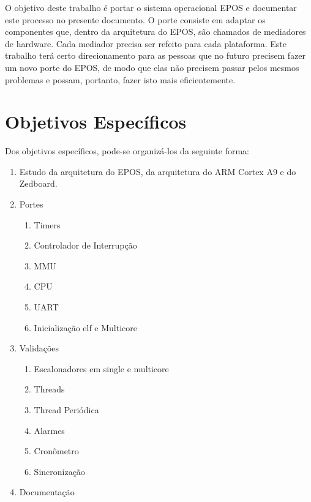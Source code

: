 O objetivo deste trabalho é portar o sistema operacional EPOS e documentar este processo no presente documento. O porte consiste em adaptar os componentes que, dentro da arquitetura do EPOS, são chamados de mediadores de hardware. Cada mediador precisa ser refeito para cada plataforma.
Este trabalho terá certo direcionamento para as pessoas que no futuro precisem fazer um novo porte do EPOS, de modo que elas não precisem passar pelos mesmos problemas e possam, portanto, fazer isto mais eficientemente.

\section{Objetivos Específicos}
Dos objetivos específicos, pode-se organizá-los da seguinte forma:

\begin{enumerate}
    \item Estudo da arquitetura do EPOS, da arquitetura do ARM Cortex A9 e do Zedboard.
    \item Portes
    \begin{enumerate}
        \item Timers
        \item Controlador de Interrupção
        \item MMU
        \item CPU
		\item UART
        \item Inicialização elf e Multicore
    \end{enumerate}
    \item Validações
    \begin{enumerate}
        \item Escalonadores em single e multicore
        \item Threads
        \item Thread Periódica
        \item Alarmes
        \item Cronômetro
        \item Sincronização
    \end{enumerate}
    \item Documentação
\end{enumerate}
